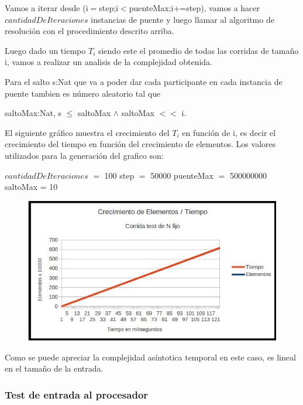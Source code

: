 Vamos a iterar desde (i$=$step;i$<$puenteMax;i+=step), vamos a hacer $cantidadDeIteraciones$ instancias de puente y luego llamar al algoritmo de resoluci\'on con el procedimiento descrito arriba.

Luego dado un tiempo $T_{i}$ siendo este el promedio de todas las corridas de tamaño i, vamos a realizar un analisis de la complejidad obtenida.

Para el salto s:Nat que va a poder dar cada participante en cada instancia de puente tambien es n\'umero aleatorio tal que

saltoMax:Nat, s $\leq$ saltoMax $\wedge$ saltoMax $<<$ i.

El siguiente gr\'afico muestra el crecimiento del $T_{i}$ en funci\'on de i, es decir el crecimiento del tiempo en funci\'on del crecimiento de elementos.
Los valores utilizados para la generaci\'on del grafico son:

\newpage

$cantidadDeIteraciones$ $=$ 100 step $=$ 50000 puenteMax $=$ 500000000 saltoMax = 10

\begin{figure}[ht]
	\begin{minipage}[t]{\linewidth}
		\centering
		\includegraphics[width=\textwidth]{grafico_de_n_fijo.jpg}
	\end{minipage}	
\end{figure}

Como se puede apreciar la complejidad as\'intotica temporal en este caso, es lineal en el tamaño de la entrada.


\newpage
\subsubsection{Test de entrada al procesador}

